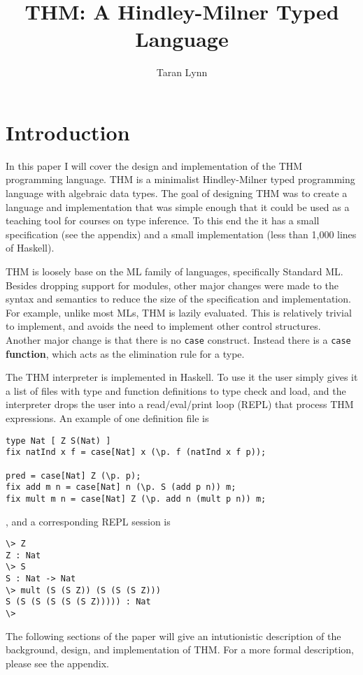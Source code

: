 \documentclass[12pt]{article}
\title{THM: A Hindley-Milner Typed Language}
\author{Taran Lynn}
\begin{document}
\maketitle


\section{Introduction}

In this paper I will cover the design and implementation of the THM
programming language.
THM is a minimalist Hindley-Milner typed
programming language with algebraic data types.
The goal of designing THM was to create a language and implementation
that was simple enough that it could be used as a teaching tool for
courses on type inference.
To this end the it has a small specification (see the appendix) and a
small implementation (less than 1,000 lines of Haskell).

THM is loosely base on the ML family of languages, specifically
Standard ML.
Besides dropping support for modules, other major changes were made to
the syntax and semantics to reduce the size of the specification and
implementation.
For example, unlike most MLs, THM is lazily evaluated.
This is relatively trivial to implement, and avoids the need to
implement other control structures.
Another major change is that there is no \verb~case~ construct.
Instead there is a \verb~case~ \textbf{function}, which acts as the
elimination rule for a type.

The THM interpreter is implemented in Haskell.
To use it the user simply gives it a list of files with type and
function definitions to type check and load, and the interpreter drops
the user into a read/eval/print loop (REPL) that process THM
expressions.
An example of one definition file is
\begin{verbatim}
type Nat [ Z S(Nat) ]
fix natInd x f = case[Nat] x (\p. f (natInd x f p));

pred = case[Nat] Z (\p. p);
fix add m n = case[Nat] n (\p. S (add p n)) m;
fix mult m n = case[Nat] Z (\p. add n (mult p n)) m;
\end{verbatim}
, and a corresponding REPL session is
\begin{verbatim}
\> Z
Z : Nat
\> S
S : Nat -> Nat
\> mult (S (S Z)) (S (S (S Z)))
S (S (S (S (S (S Z))))) : Nat
\>
\end{verbatim}

The following sections of the paper will give an intutionistic
description of the background, design, and implementation of THM.
For a more formal description, please see the appendix.
\end{document}
